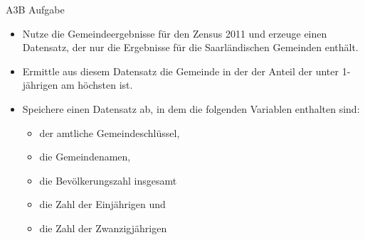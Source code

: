 \documentclass[ignorenonframetext,]{beamer}
\providecommand{\tightlist}{%
  \setlength{\itemsep}{0pt}\setlength{\parskip}{0pt}}
\begin{document}
\begin{frame}{A3B Aufgabe}
\protect\hypertarget{a3b-aufgabe}{}

\begin{itemize}
\tightlist
\item
  Nutze die Gemeindeergebnisse für den Zensus 2011 und erzeuge einen
  Datensatz, der nur die Ergebnisse für die Saarländischen Gemeinden
  enthält.
\item
  Ermittle aus diesem Datensatz die Gemeinde in der der Anteil der unter
  1-jährigen am höchsten ist.
\item
  Speichere einen Datensatz ab, in dem die folgenden Variablen enthalten
  sind:

  \begin{itemize}
  \tightlist
  \item
    der amtliche Gemeindeschlüssel,
  \item
    die Gemeindenamen,\\
  \item
    die Bevölkerungszahl insgesamt
  \item
    die Zahl der Einjährigen und
  \item
    die Zahl der Zwanzigjährigen
  \end{itemize}
\end{itemize}

\end{frame}
\end{document}
